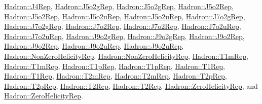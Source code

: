 \mbox{\hyperlink{structHadron_1_1J4Rep}{Hadron\+::\+J4\+Rep}}, \mbox{\hyperlink{structHadron_1_1J5o2gRep}{Hadron\+::\+J5o2g\+Rep}}, \mbox{\hyperlink{structHadron_1_1J5o2gRep}{Hadron\+::\+J5o2g\+Rep}}, \mbox{\hyperlink{structHadron_1_1J5o2Rep}{Hadron\+::\+J5o2\+Rep}}, \mbox{\hyperlink{structHadron_1_1J5o2Rep}{Hadron\+::\+J5o2\+Rep}}, \mbox{\hyperlink{structHadron_1_1J5o2uRep}{Hadron\+::\+J5o2u\+Rep}}, \mbox{\hyperlink{structHadron_1_1J5o2uRep}{Hadron\+::\+J5o2u\+Rep}}, \mbox{\hyperlink{structHadron_1_1J7o2gRep}{Hadron\+::\+J7o2g\+Rep}}, \mbox{\hyperlink{structHadron_1_1J7o2gRep}{Hadron\+::\+J7o2g\+Rep}}, \mbox{\hyperlink{structHadron_1_1J7o2Rep}{Hadron\+::\+J7o2\+Rep}}, \mbox{\hyperlink{structHadron_1_1J7o2Rep}{Hadron\+::\+J7o2\+Rep}}, \mbox{\hyperlink{structHadron_1_1J7o2uRep}{Hadron\+::\+J7o2u\+Rep}}, \mbox{\hyperlink{structHadron_1_1J7o2uRep}{Hadron\+::\+J7o2u\+Rep}}, \mbox{\hyperlink{structHadron_1_1J9o2gRep}{Hadron\+::\+J9o2g\+Rep}}, \mbox{\hyperlink{structHadron_1_1J9o2gRep}{Hadron\+::\+J9o2g\+Rep}}, \mbox{\hyperlink{structHadron_1_1J9o2Rep}{Hadron\+::\+J9o2\+Rep}}, \mbox{\hyperlink{structHadron_1_1J9o2Rep}{Hadron\+::\+J9o2\+Rep}}, \mbox{\hyperlink{structHadron_1_1J9o2uRep}{Hadron\+::\+J9o2u\+Rep}}, \mbox{\hyperlink{structHadron_1_1J9o2uRep}{Hadron\+::\+J9o2u\+Rep}}, \mbox{\hyperlink{structHadron_1_1NonZeroHelicityRep}{Hadron\+::\+Non\+Zero\+Helicity\+Rep}}, \mbox{\hyperlink{structHadron_1_1NonZeroHelicityRep}{Hadron\+::\+Non\+Zero\+Helicity\+Rep}}, \mbox{\hyperlink{structHadron_1_1T1mRep}{Hadron\+::\+T1m\+Rep}}, \mbox{\hyperlink{structHadron_1_1T1mRep}{Hadron\+::\+T1m\+Rep}}, \mbox{\hyperlink{structHadron_1_1T1pRep}{Hadron\+::\+T1p\+Rep}}, \mbox{\hyperlink{structHadron_1_1T1pRep}{Hadron\+::\+T1p\+Rep}}, \mbox{\hyperlink{structHadron_1_1T1Rep}{Hadron\+::\+T1\+Rep}}, \mbox{\hyperlink{structHadron_1_1T1Rep}{Hadron\+::\+T1\+Rep}}, \mbox{\hyperlink{structHadron_1_1T2mRep}{Hadron\+::\+T2m\+Rep}}, \mbox{\hyperlink{structHadron_1_1T2mRep}{Hadron\+::\+T2m\+Rep}}, \mbox{\hyperlink{structHadron_1_1T2pRep}{Hadron\+::\+T2p\+Rep}}, \mbox{\hyperlink{structHadron_1_1T2pRep}{Hadron\+::\+T2p\+Rep}}, \mbox{\hyperlink{structHadron_1_1T2Rep}{Hadron\+::\+T2\+Rep}}, \mbox{\hyperlink{structHadron_1_1T2Rep}{Hadron\+::\+T2\+Rep}}, \mbox{\hyperlink{structHadron_1_1ZeroHelicityRep}{Hadron\+::\+Zero\+Helicity\+Rep}}, and \mbox{\hyperlink{structHadron_1_1ZeroHelicityRep}{Hadron\+::\+Zero\+Helicity\+Rep}}.

